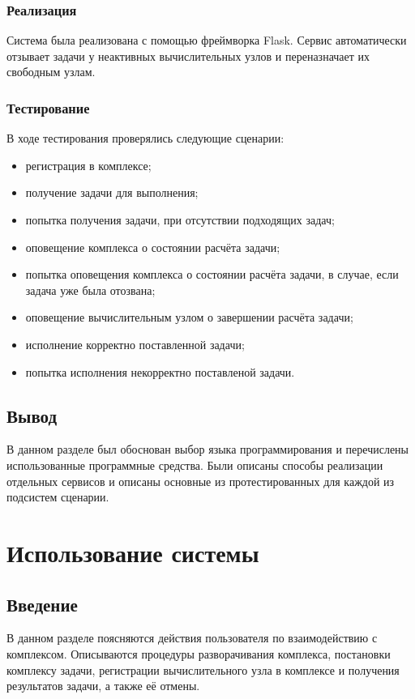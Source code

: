 \documentclass[a4paper,12pt]{report}
\numberwithin{equation}{section}
\begin{document}
  \subsubsection{Реализация}
  Система была реализована с помощью фреймворка Flask.
  Сервис автоматически отзывает задачи у неактивных вычислительных узлов и переназначает их свободным узлам.
  
  \subsubsection{Тестирование}
  В ходе тестирования проверялись следующие сценарии:
  
  \begin{itemize}
    \item регистрация в комплексе;
    \item получение задачи для выполнения;
    \item попытка получения задачи, при отсутствии подходящих задач;
    \item оповещение комплекса о состоянии расчёта задачи;
    \item попытка оповещения комплекса о состоянии расчёта задачи, в случае, если задача уже была отозвана;
    \item оповещение вычислительным узлом о завершении расчёта задачи;
    \item исполнение корректно поставленной задачи;
    \item попытка исполнения некорректно поставленой задачи.
  \end{itemize}
  
  \subsection{Вывод}
  В данном разделе был обоснован выбор языка программирования и перечислены использованные программные средства.
  Были описаны способы реализации отдельных сервисов и описаны основные из протестированных для каждой из подсистем сценарии.
  
  \section{Использование системы}  
  \subsection{Введение}
  В данном разделе поясняются действия пользователя по взаимодействию с комплексом. 
  Описываются процедуры разворачивания комплекса, постановки комплексу задачи, регистрации вычислительного узла в комплексе и получения результатов задачи, а также её отмены.
  
\end{document}
